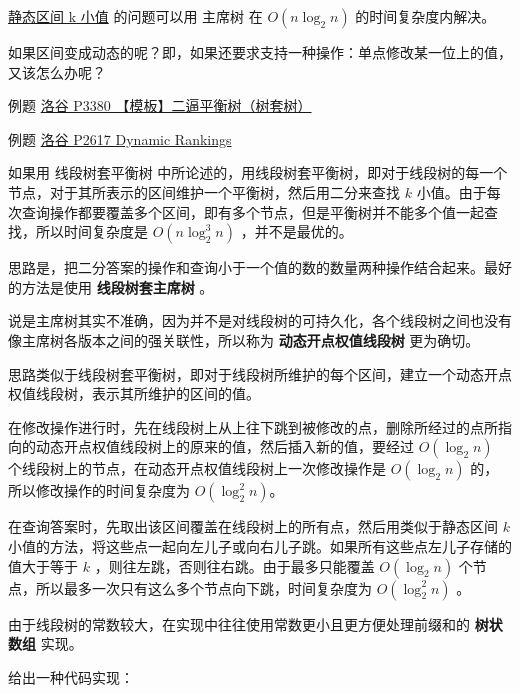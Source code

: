
\href{https://www.luogu.org/problemnew/show/P3834}{静态区间 k 小值} 的问题可以用  主席树  在 $O(n\log_2 n)$ 的时间复杂度内解决。

如果区间变成动态的呢？即，如果还要求支持一种操作：单点修改某一位上的值，又该怎么办呢？

\begin{NOTE}{例题 \href{https://www.luogu.org/problemnew/show/P3380}{洛谷 P3380 【模板】二逼平衡树（树套树）}}{}

\end{NOTE}


\begin{NOTE}{例题 \href{https://www.luogu.org/problemnew/show/P2617}{洛谷 P2617 Dynamic Rankings}}{}

\end{NOTE}


如果用  线段树套平衡树  中所论述的，用线段树套平衡树，即对于线段树的每一个节点，对于其所表示的区间维护一个平衡树，然后用二分来查找 $k$ 小值。由于每次查询操作都要覆盖多个区间，即有多个节点，但是平衡树并不能多个值一起查找，所以时间复杂度是 $O(n\log_2^3 n)$ ，并不是最优的。

思路是，把二分答案的操作和查询小于一个值的数的数量两种操作结合起来。最好的方法是使用 \textbf{ 线段树套主席树 } 。

说是主席树其实不准确，因为并不是对线段树的可持久化，各个线段树之间也没有像主席树各版本之间的强关联性，所以称为 \textbf{ 动态开点权值线段树 } 更为确切。 

思路类似于线段树套平衡树，即对于线段树所维护的每个区间，建立一个动态开点权值线段树，表示其所维护的区间的值。

在修改操作进行时，先在线段树上从上往下跳到被修改的点，删除所经过的点所指向的动态开点权值线段树上的原来的值，然后插入新的值，要经过 $O(\log_2 n)$ 个线段树上的节点，在动态开点权值线段树上一次修改操作是 $O(\log_2 n)$ 的，所以修改操作的时间复杂度为 $O(\log_2^2 n)$。 

在查询答案时，先取出该区间覆盖在线段树上的所有点，然后用类似于静态区间 $k$ 小值的方法，将这些点一起向左儿子或向右儿子跳。如果所有这些点左儿子存储的值大于等于 $k$ ，则往左跳，否则往右跳。由于最多只能覆盖 $O(\log_2 n)$ 个节点，所以最多一次只有这么多个节点向下跳，时间复杂度为 $O(\log_2^2 n)$ 。 

由于线段树的常数较大，在实现中往往使用常数更小且更方便处理前缀和的 \textbf{ 树状数组 } 实现。 

给出一种代码实现：

